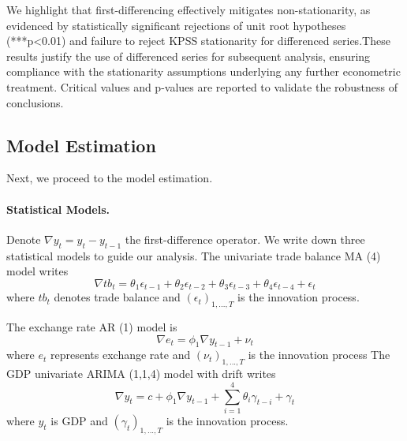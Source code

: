 \documentclass[
]{article}
\begin{document}
We highlight that first-differencing effectively mitigates
non-stationarity, as evidenced by statistically significant rejections of
unit root hypotheses (***p<0.01) and failure to reject KPSS stationarity for 
differenced series.These results justify the use of differenced series for subsequent analysis, 
ensuring compliance with the stationarity assumptions underlying any further 
econometric treatment. Critical values and p-values are reported to validate the robustness
of conclusions.

\subsection{Model Estimation}

Next, we proceed to the model estimation.

\paragraph*{Statistical Models.}

Denote \( \nabla y_t = y_t - y_{t-1} \) the first-difference operator. We write
down three statistical models to guide our analysis. The univariate trade balance MA (4) model writes
\begin{equation}
        \nabla tb_t = \theta_1 \epsilon_{t-1} + \theta_2 \epsilon_{t-2} + \theta_3 \epsilon_{t-3} + \theta_4 \epsilon_{t-4} + \epsilon_t
    \end{equation}
     where \( tb_t \) denotes trade balance and $(\epsilon_t)_{1,..., T}$ is the innovation process.
    
The exchange rate AR (1) model is 
    \begin{equation}
        \nabla e_t = \phi_1 \nabla y_{t-1} + \nu_t
    \end{equation}
     where \( e_t \) represents exchange rate and $(\nu_t)_{1,..., T}$ is the innovation process 
The GDP univariate ARIMA (1,1,4) model with drift writes
    \begin{equation}
        \nabla y_t = c + \phi_1 \nabla y_{t-1} + \sum_{i=1}^4 \theta_i \gamma_{t-i} + \gamma_t
    \end{equation}
     where \( y_t \) is GDP and $(\gamma_t)_{1,..., T}$ is the innovation process.
\end{document}
